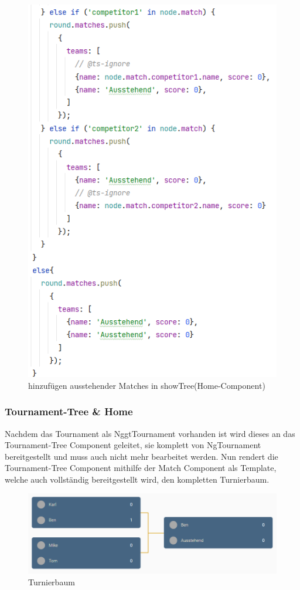 \begin{figure}[H]
    \includegraphics[scale=0.7]{pics/frontend/ausstehende_matches.PNG}
    \caption{hinzufügen ausstehender Matches in showTree(Home-Component)}
\end{figure}

\subsubsection{Tournament-Tree \& Home}
Nachdem das Tournament als NggtTournament vorhanden ist wird dieses an das Tournament-Tree Component geleitet, sie komplett von NgTournament bereitgestellt und muss auch nicht mehr bearbeitet werden. 
Nun rendert die Tournament-Tree Component mithilfe der Match Component als Template, welche auch vollständig bereitgestellt wird, den kompletten Turnierbaum.

\bigskip
\begin{figure}[H]
    \includegraphics[scale=0.7]{pics/frontend/tournament-tree.PNG}
    \caption{Turnierbaum}
\end{figure}

